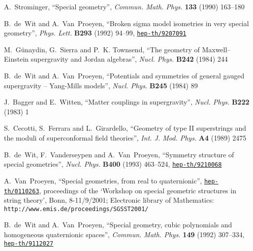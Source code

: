 \documentclass[a4paper,11pt,twoside]{article}
\begin{document}
\begin{thebibliography}{10}
{\sc A.~Strominger}, ``Special geometry'',  {\sl Commun. Math. Phys.}
{\bf 133}
  (1990)
163--180

{\sc B.~de~Wit and A.~Van~Proeyen}, ``Broken sigma model isometries in
very
  special geometry'',  {\sl Phys. Lett.} {\bf B293} (1992) 94--99,
\href{http://arXiv.org/abs/hep-th/9207091}{{\tt hep-th/9207091}}

{\sc M.~G{\"u}naydin, G.~Sierra  and P.~K. Townsend}, ``The geometry of \coordHE{}
  Maxwell--Einstein supergravity and Jordan algebras'',  {\sl Nucl. Phys.} {\bf
  B242} (1984)
244

{\sc B.~de~Wit and A.~Van~Proeyen}, ``Potentials and symmetries of
general
  gauged \coordHE{} supergravity -- Yang-Mills models'',  {\sl Nucl. Phys.} {\bf
  B245} (1984)
89

{\sc J.~Bagger and E.~Witten}, ``Matter couplings in \coordHE{}
supergravity'',
  {\sl Nucl. Phys.} {\bf B222} (1983)
1

{\sc S.~Cecotti, S.~Ferrara  and L.~Girardello}, ``Geometry of type II
  superstrings and the moduli of superconformal field theories'',  {\sl Int. J.
  Mod. Phys.} {\bf A4} (1989)
2475

{\sc B.~de~Wit, F.~Vanderseypen  and A.~Van~Proeyen}, ``Symmetry
structure of
  special geometries'',  {\sl Nucl. Phys.} {\bf B400} (1993) 463--524,
\href{http://www.arXiv.org/abs/hep-th/9210068}{{\tt hep-th/9210068}}

{\sc A.~Van~Proeyen}, ``Special geometries, from real to quaternionic'',
  \href{http://arXiv.org/abs/hep-th/0110263}{{\tt hep-th/0110263}},
proceedings of the `Workshop on special geometric structures in string
theory',
  Bonn, 8-11/9/2001; Electronic library of Mathematics:
  \texttt{http://www.emis.de/proceedings/SGSST2001/}

{\sc B.~de~Wit and A.~Van~Proeyen}, ``Special geometry, cubic polynomials
and
  homogeneous quaternionic spaces'',  {\sl Commun. Math. Phys.} {\bf 149}
  (1992) 307--334,
\href{http://arXiv.org/abs/hep-th/9112027}{{\tt hep-th/9112027}}


\end{thebibliography}
\end{document}
